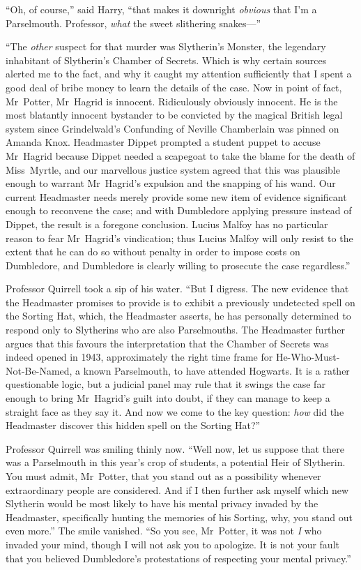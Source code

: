 “Oh, of course,” said Harry, “that makes it downright \emph{obvious} that I’m a Parselmouth. Professor, \emph{what} the sweet slithering snakes—”

“The \emph{other} suspect for that murder was Slytherin’s Monster, the legendary inhabitant of Slytherin’s Chamber of Secrets. Which is why certain sources alerted me to the fact, and why it caught my attention sufficiently that I spent a good deal of bribe money to learn the details of the case. Now in point of fact, Mr~Potter, Mr~Hagrid is innocent. Ridiculously obviously innocent. He is the most blatantly innocent bystander to be convicted by the magical British legal system since Grindelwald’s Confunding of Neville Chamberlain was pinned on Amanda Knox. Headmaster Dippet prompted a student puppet to accuse Mr~Hagrid because Dippet needed a scapegoat to take the blame for the death of Miss~Myrtle, and our marvellous justice system agreed that this was plausible enough to warrant Mr~Hagrid’s expulsion and the snapping of his wand. Our current Headmaster needs merely provide some new item of evidence significant enough to reconvene the case; and with Dumbledore applying pressure instead of Dippet, the result is a foregone conclusion. Lucius Malfoy has no particular reason to fear Mr~Hagrid’s vindication; thus Lucius Malfoy will only resist to the extent that he can do so without penalty in order to impose costs on Dumbledore, and Dumbledore is clearly willing to prosecute the case regardless.”

Professor Quirrell took a sip of his water.
“But I digress. The new evidence that the Headmaster promises to provide is to exhibit a previously undetected spell on the Sorting Hat, which, the Headmaster asserts, he has personally determined to respond only to Slytherins who are also Parselmouths. The Headmaster further argues that this favours the interpretation that the Chamber of Secrets was indeed opened in 1943, approximately the right time frame for He-Who-Must-Not-Be-Named, a known Parselmouth, to have attended Hogwarts. It is a rather questionable logic, but a judicial panel may rule that it swings the case far enough to bring Mr~Hagrid’s guilt into doubt, if they can manage to keep a straight face as they say it. And now we come to the key question: \emph{how} did the Headmaster discover this hidden spell on the Sorting Hat?”

Professor Quirrell was smiling thinly now.
“Well now, let us suppose that there was a Parselmouth in this year’s crop of students, a potential Heir of Slytherin. You must admit, Mr~Potter, that you stand out as a possibility whenever extraordinary people are considered. And if I then further ask myself which new Slytherin would be most likely to have his mental privacy invaded by the Headmaster, specifically hunting the memories of his Sorting, why, you stand out even more.” The smile vanished.
“So you see, Mr~Potter, it was not \emph{I} who invaded your mind, though I will not ask you to apologize. It is not your fault that you believed Dumbledore’s protestations of respecting your mental privacy.”

